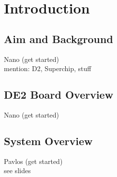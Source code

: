 \chapter{Introduction}

\section{Aim and Background}
Nano (get started) \\
mention: D2, Superchip, stuff

\section{DE2 Board Overview}
Nano (get started)

\section{System Overview}
Pavlos (get started) \\
see slides